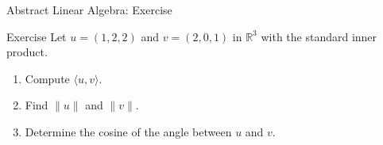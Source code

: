 \cyanheader
\begin{frame}{Abstract Linear Algebra: Exercise}
\begin{cyan*}{Exercise}
Let $u=(1,2,2)$ and $v=(2,0,1)$ in $\mathbb{R}^3$ with the standard inner product.
\begin{enumerate}
    \item Compute $\langle u,v \rangle$.
    \item Find $\|u\|$ and $\|v\|$.
    \item Determine the cosine of the angle between $u$ and $v$.
\end{enumerate}
\end{cyan*}
\end{frame}
